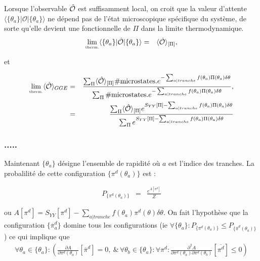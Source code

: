 	Lorsque l'observable $\hat{\mathbf{\mathcal{O}}}$ est suffisamment local, on croit que la valeur d'attente $\langle  \{ \theta_a\}  \vert   \mathcal{O} \vert \{ \theta_a\} \rangle$ ne dépend pas de l'état microscopique spécifique du système, de sorte qu'elle devient une fonctionnelle de $\Pi$ dans la limite thermodynamique.
	\begin{eqnarray}
		\underset{\mbox{\tiny therm.}}{\lim} \langle  \{ \theta_a\}  \vert   \hat{\mathbf{\mathcal{O}}} \vert \{ \theta_a\} \rangle & = & \langle \hat{\mathbf{\mathcal{O}}}\rangle_{[\Pi]},
	\end{eqnarray}
	
	et 
	
	\begin{eqnarray}
		\underset{\mbox{\tiny therm.}}{\lim} \langle \hat{\mathbf{\mathcal{O}}} \rangle_{GGE} & =  & \frac{ \sum_{\Pi}  \langle \hat{\mathbf{\mathcal{O}}}\rangle_{[\Pi]} \# \mbox{microstates.} e^{- \sum_{a \vert tranche} f(\theta_a) \Pi ( \theta_a )  \delta \theta}    }{\sum_{\Pi} \# \mbox{microstates.}  e^{- \sum_{a \vert tranche }  f(\theta_a) \Pi ( \theta_a ) \delta \theta } },\\
		& = & \frac{ \sum_{\Pi}  \langle \hat{\mathbf{\mathcal{O}}}\rangle_{[\Pi]}  e^{ S_{YY}[\Pi]- \sum_{a \vert tranche} f(\theta_a) \Pi ( \theta_a )  \delta \theta}    }{\sum_{\Pi}  e^{S_{YY}[\Pi] - \sum_{a \vert tranche }  f(\theta_a) \Pi ( \theta_a ) \delta \theta } }
	\end{eqnarray}
	
\subsubsection{.....}

	Maintenant $\{\theta_a \}$ désigne l'ensemble de rapidité où $a$ est l'indice des tranches. La probalilité de cette configuration $\{ \pi^d(\theta_a) \}$ est : 
	
	\begin{eqnarray}
		P_{\{ \pi^d(\theta_a)\} } & = & \frac{ e^{ A[\pi^d]  }}{Z} 	
	\end{eqnarray}
	
	ou $A[\pi^d] = S_{YY}[\pi^d] - \sum_{a\vert tranche} f(\theta_a) \pi^d ( \theta) \delta \theta $. On fait l'hypothèse que la configuration $\{ \overline{\pi}_a^d \}$ domine tous les configurations (ie $\forall \{ \theta_a\}  \colon P_{\{ \pi^d(\theta_a)\} } \leq P_{\{ \overline{\pi}^d(\theta_a)\} }$) ce qui implique que  
	\begin{eqnarray*}
		\forall \theta_a  \in \{\theta_a \}\colon  \left ( \frac{\partial A}{\partial \pi^d(\theta_a) } [\overline{\pi}^d]	 = 0 , ~ \& \,  \forall \theta_b \in \{\theta_a \} \colon  \forall \pi^d \colon \frac{\partial^2 A}{\partial \pi^d(\theta_a) \partial \pi^d(\theta_b) } [\overline{\pi^d}] \leq  0 	\right ) 
	\end{eqnarray*}
	
